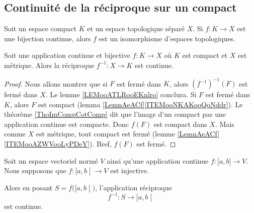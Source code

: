 \subsection{Continuité de la réciproque sur un compact}

\begin{lemma}       \label{LEMooNEEVooSeHYzx}
	Soit un espace compact \( K\) et un espace topologique séparé \( X\). Si \( f\colon K\to X\) est une bijection continue, alors \( f\) est un isomorphisme d'espaces topologiques.
\end{lemma}

\begin{lemma}     \label{LEMooPLGTooATIGov}
	Soit une application continue et bijective \( f\colon K\to X \) où \( K\) est compact et \( X\) est métrique. Alors la réciproque \(f^{-1}\colon X\to K\) est continue.
\end{lemma}

\begin{proof}
	Nous allons montrer que si \( F\) est fermé dans \( K\), alors \( (f^{-1})^{-1}(F)\) est fermé dans \( X\). Le lemme \ref{LEMooATLRooEKnlro} conclura. Si \( F\) est fermé dans \( K\), alors \( F\) est compact (lemma \ref{LemnAeACf}\ref{ITEMooNKAKooQoNddr}). Le théorème \ref{ThoImCompCotComp} dit que l'image d'un compact par une application continue est compacte. Donc \( f(F)\) est compact dans \( X\). Mais comme \( X\) est métrique, tout compact est fermé (lemme \ref{LemnAeACf}\ref{ITEMooAZWVooLyPDeY}). Bref, \( f(F)\) est fermé.
\end{proof}

\begin{lemma}        \label{LEMooKSDKooDbKKeB}
	Soit un espace vectoriel normé \( V\) ainsi qu'une application continue \( f\colon \mathopen[ a , b \mathclose]\to V\). Nous supposons que \( f\colon \mathopen[ a , b \mathclose[\to V\) est injective.

	Alors en posant \( S=f\big( \mathopen[ a , b \mathclose[ \big)\), l'application réciproque
	\begin{equation}
		f^{-1}\colon S\to \mathopen[ a , b \mathclose[
	\end{equation}
	est continue.
\end{lemma}

